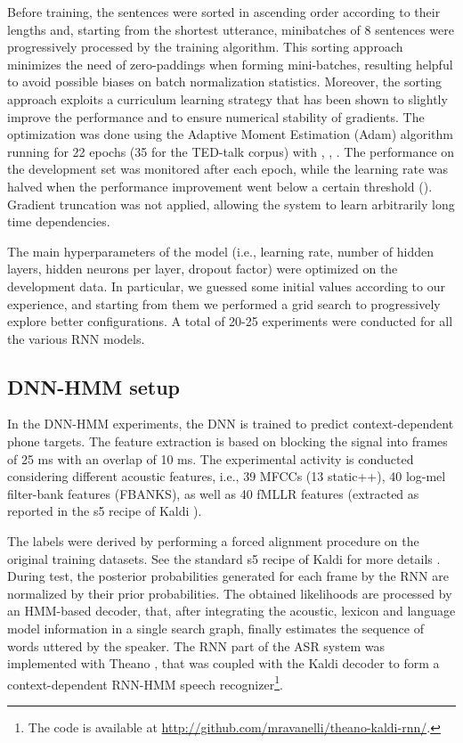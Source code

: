 \documentclass[journal]{IEEEtran}
\begin{document}
Before training, the sentences were sorted in ascending order according to their lengths and, starting from the shortest utterance, minibatches of 8 sentences were progressively processed by the training algorithm.
This sorting approach minimizes the need of zero-paddings when forming mini-batches, resulting helpful to avoid possible biases on batch normalization statistics. Moreover, the sorting approach exploits a curriculum learning strategy \cite{curriculum} that has been shown to slightly improve the performance and to ensure numerical stability of gradients. The optimization was done using the Adaptive Moment Estimation (Adam) algorithm \cite{adam} running for 22 epochs (35 for the TED-talk corpus) with , , . The performance on the development set was monitored after each epoch, while the learning rate was halved when the performance improvement went below a certain threshold (). Gradient truncation was not applied, allowing the system to learn arbitrarily long time dependencies.

The main hyperparameters of the model (i.e., learning rate, number of hidden layers, hidden neurons per layer, dropout factor) were optimized on the development data. 
In particular, we guessed some initial values according to our experience, and starting from them we performed a grid search to progressively explore better configurations. A total of 20-25 experiments were conducted for all the various RNN models.


\subsection{DNN-HMM setup} \label{sec:hmm_dnn}
In the DNN-HMM experiments, the DNN is trained to predict context-dependent phone targets. 
The feature extraction is based on blocking the signal into frames of 25 ms with an overlap of 10 ms.  The experimental activity is conducted considering different acoustic features, i.e., 39 MFCCs (13 static++), 40 log-mel filter-bank features (FBANKS), as well as 40 fMLLR features (extracted as reported in the s5 recipe of Kaldi \cite{kaldi}).

The labels were derived by performing a forced alignment procedure on the original training datasets. See the standard s5 recipe of Kaldi for more details \cite{kaldi}.
During test, the posterior probabilities generated  for each frame by the RNN are normalized by their prior probabilities. 
The obtained likelihoods are processed by an HMM-based decoder, that, after integrating the acoustic, lexicon and language model information in a single search graph, finally estimates the sequence of words uttered  by the speaker.
The RNN part of the ASR system was implemented with Theano \cite{theano}, that was  coupled with the Kaldi decoder \cite{kaldi} to form a context-dependent RNN-HMM speech recognizer\footnote{The code is available at \url{http://github.com/mravanelli/theano-kaldi-rnn/}.}.
\end{document}
